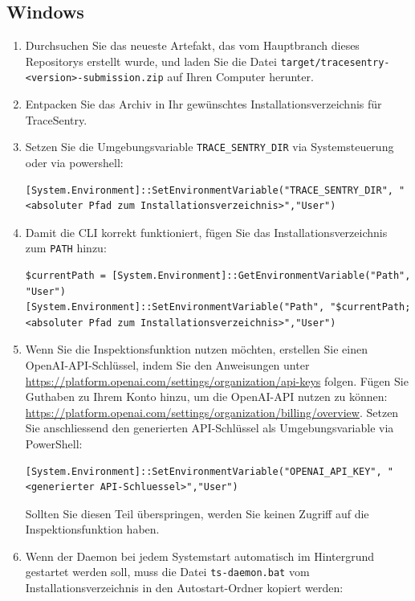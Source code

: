 \documentclass[a4paper,12pt]{report}
\begin{document}
    \subsection{Windows}
    \begin{enumerate}
        \item Durchsuchen Sie das neueste Artefakt, das vom Hauptbranch dieses Repositorys erstellt wurde, und laden Sie die Datei
        \texttt{target/tracesentry-\textless{}version\textgreater{}-submission.zip} auf Ihren Computer herunter.
        \item Entpacken Sie das Archiv in Ihr gewünschtes Installationsverzeichnis für TraceSentry.
        \item Setzen Sie die Umgebungsvariable \texttt{TRACE\_SENTRY\_DIR} via Systemsteuerung oder via \gls{powershell}:
        \begin{lstlisting}[label={lst:lstlisting-windows-1}]
[System.Environment]::SetEnvironmentVariable("TRACE_SENTRY_DIR", "<absoluter Pfad zum Installationsverzeichnis>","User")
        \end{lstlisting}
        \item Damit die CLI korrekt funktioniert, fügen Sie das Installationsverzeichnis zum \texttt{PATH} hinzu:
        \begin{lstlisting}[label={lst:lstlisting-windows-2}]
$currentPath = [System.Environment]::GetEnvironmentVariable("Path", "User")
[System.Environment]::SetEnvironmentVariable("Path", "$currentPath;<absoluter Pfad zum Installationsverzeichnis>","User")
        \end{lstlisting}
        \item Wenn Sie die Inspektionsfunktion nutzen möchten, erstellen Sie einen OpenAI-API-Schlüssel, indem Sie den Anweisungen unter \url{https://platform.openai.com/settings/organization/api-keys} folgen.
        Fügen Sie Guthaben zu Ihrem Konto hinzu, um die OpenAI-API nutzen zu können: \url{https://platform.openai.com/settings/organization/billing/overview}.
        Setzen Sie anschliessend den generierten API-Schlüssel als Umgebungsvariable via PowerShell:
        \begin{lstlisting}[label={lst:lstlisting-windows-3}]
[System.Environment]::SetEnvironmentVariable("OPENAI_API_KEY", "<generierter API-Schluessel>","User")
        \end{lstlisting}
        Sollten Sie diesen Teil überspringen, werden Sie keinen Zugriff auf die Inspektionsfunktion haben.
        \item Wenn der Daemon bei jedem Systemstart automatisch im Hintergrund gestartet werden soll, muss die Datei \texttt{ts-daemon.bat} vom Installationsverzeichnis in den Autostart-Ordner kopiert werden:

\end{enumerate}
\end{document}
